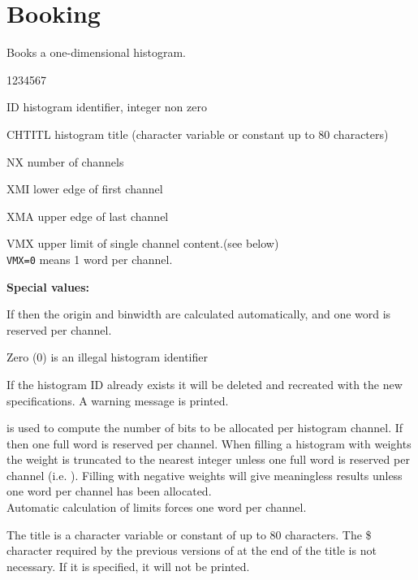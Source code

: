 \section{\label{HBOOKING}Booking}
\Action Books a one-dimensional histogram.
\Pdesc\begin{DLtt}{1234567}
\item[ID] histogram identifier, integer non zero
\item[CHTITL] histogram title (character variable or constant up to 80
characters)
\item[NX] number of channels
\item[XMI] lower edge of first channel
\item[XMA] upper edge of last channel
\item[VMX] upper limit of single channel content.(see below)\\
{\tt VMX=0} means 1 word per channel.
\end{DLtt}
{\bf Special values:}
\begin{UL}
\item If   then the  origin and binwidth are
calculated automatically, and one word is reserved per channel.
\item Zero (0) is an illegal histogram identifier
\item If the histogram ID already exists it will be deleted and
recreated with the new specifications. A warning message is printed.
\item {} is used to compute the number
of bits to be allocated per histogram channel.
If  then one
full word is reserved per channel.
When filling a histogram with weights the weight is
truncated to the nearest integer unless one full word is
reserved per channel (i.e. ).
Filling with negative weights will give meaningless results
unless one word per channel has been allocated.\\
Automatic calculation of limits forces one word per channel.
\item
The title is a character variable or constant of up to 80 characters.
The \$ character required by the previous versions of 
at the end of the title is not necessary. If it is specified, it
will not be printed.
\end{UL}
